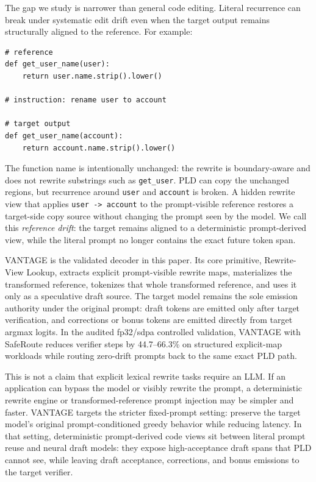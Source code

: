 \documentclass[11pt,a4paper]{article}
\begin{document}
The gap we study is narrower than general code editing. Literal recurrence can
break under systematic edit drift even when the target output remains
structurally aligned to the reference. For example:

\begin{lstlisting}[basicstyle=\ttfamily\tiny,frame=single]
# reference
def get_user_name(user):
    return user.name.strip().lower()

# instruction: rename user to account

# target output
def get_user_name(account):
    return account.name.strip().lower()
\end{lstlisting}

The function name is intentionally unchanged: the rewrite is boundary-aware and
does not rewrite substrings such as \texttt{get\_user}.
PLD can copy the unchanged regions, but recurrence around \texttt{user} and
\texttt{account} is broken. A hidden rewrite view that applies
\texttt{user -> account} to the prompt-visible reference restores a target-side
copy source without changing the prompt seen by the model. We call this
\emph{reference drift}: the target remains aligned to a deterministic
prompt-derived view, while the literal prompt no longer contains the exact
future token span.

VANTAGE is the validated decoder in this paper. Its core primitive,
Rewrite-View Lookup, extracts explicit prompt-visible rewrite maps, materializes
the transformed reference, tokenizes that whole transformed reference, and uses
it only as a speculative draft source. The target model remains the sole
emission authority under the original prompt: draft tokens are emitted only
after target verification, and corrections or bonus tokens are emitted directly
from target argmax logits. In the audited fp32/sdpa controlled validation,
VANTAGE with SafeRoute reduces verifier steps by
44.7--66.3\% on structured explicit-map workloads while routing zero-drift
prompts back to the same exact PLD path.

This is not a claim that explicit lexical rewrite tasks require an LLM. If an
application can bypass the model or visibly rewrite the prompt, a deterministic
rewrite engine or transformed-reference prompt injection may be simpler and
faster. VANTAGE targets the stricter fixed-prompt setting: preserve the target
model's original prompt-conditioned greedy behavior while reducing latency. In
that setting, deterministic prompt-derived code views sit between literal prompt
reuse and neural draft models: they expose high-acceptance draft spans that PLD
cannot see, while leaving draft acceptance, corrections, and bonus emissions to
the target verifier.
\end{document}
